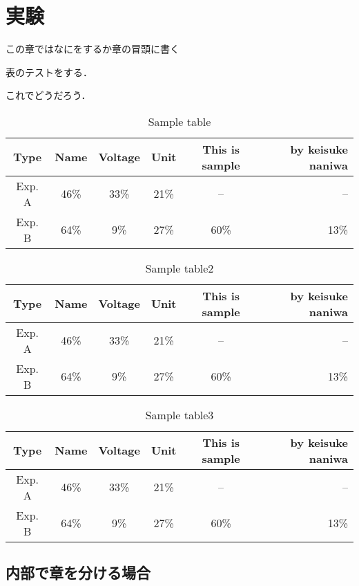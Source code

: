 \chapter{実験}
\label{Sec:experiment}

この章ではなにをするか章の冒頭に書く

表のテストをする．

これでどうだろう．

\begin{table}[tb]
    \caption{Sample table}
     \label{table:test}
     \centering
     \begin{tabular}{cccccr}\hline
      Type & Name & Voltage & Unit & This is sample & by keisuke naniwa\\ \hline \hline
     Exp. A & 46\%& 33\%& 21\%& --& --\\ 
     Exp. B & 64\%& 9\%& 27\%& 60\%& 13\%\\ \hline    
     \end{tabular}
\end{table}


\begin{table*}[tb]
    \caption{Sample table2}
     \label{table:test2}
     \centering
     \begin{tabular}{cccccr}\hline
      Type & Name & Voltage & Unit & This is sample & by keisuke naniwa\\ \hline \hline
     Exp. A & 46\%& 33\%& 21\%& --& --\\ 
     Exp. B & 64\%& 9\%& 27\%& 60\%& 13\%\\ \hline    
     \end{tabular}
\end{table*}


\begin{table*}[tb]
    \caption{Sample table3}
     \label{table:test3}
     \centering
     \begin{tabular}{cccccr}\hline
      Type & Name & Voltage & Unit & This is sample & by keisuke naniwa\\ \hline \hline
     Exp. A & 46\%& 33\%& 21\%& --& --\\ 
     Exp. B & 64\%& 9\%& 27\%& 60\%& 13\%\\ \hline    
     \end{tabular}
\end{table*}



\section{内部で章を分ける場合}\label{Sec:sub_experiment}

